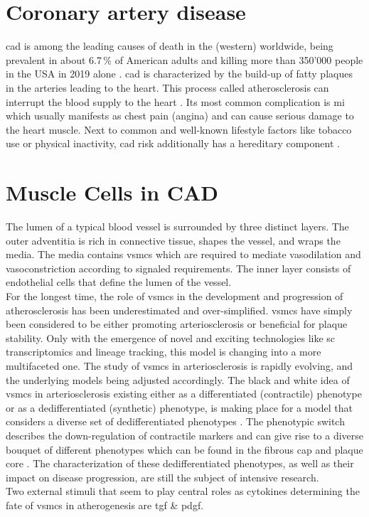 \section{Coronary artery disease}
\label{sec:cad}
\Ac{cad} is among the leading causes of death in the (western) worldwide, being prevalent in about 6.7\,\% of American adults and killing more than 350'000 people in the USA in 2019 alone \cite{centersfordiseasecontrolandpreventionHeartDiseaseFacts2022, fryarPrevalenceUncontrolledRisk2012}. \Ac{cad} is characterized by the build-up of fatty plaques in the arteries leading to the heart. This process called atherosclerosis can interrupt the blood supply to the heart \cite{nationalhealthserviceHeartAttack2017}. Its most common complication is \ac{mi} which usually manifests as chest pain (angina) and can cause serious damage to the heart muscle.  Next to common and well-known lifestyle factors like tobacco use or physical inactivity, \ac{cad} risk additionally has a hereditary component \cite{montalescot2013ESCGuidelines2013}.


\section{Muscle Cells in CAD}
\label{sec:haosms}
The lumen of a typical blood vessel is surrounded by three distinct layers. The outer adventitia is rich in connective tissue, shapes the vessel, and wraps the media. The media contains \acp{vsmc} which are required to mediate vasodilation and vasoconstriction according to signaled requirements. The inner layer consists of endothelial cells that define the lumen of the vessel. \cite{tuckerAnatomyBloodVessels2022a, yapSixShadesVascular2021}\\
For the longest time, the role of \acp{vsmc} in the development and progression of atherosclerosis has been underestimated and over-simplified. \acp{vsmc} have simply been considered to be either promoting arteriosclerosis or beneficial for plaque stability. Only with the emergence of novel and exciting technologies like \ac{sc} transcriptomics and lineage tracking, this model is changing into a more multifaceted one. \cite{grootaertVascularSmoothMuscle2021, yapSixShadesVascular2021} The study of \acp{vsmc} in arteriosclerosis is rapidly evolving, and the underlying models being adjusted accordingly. The black and white idea of \acp{vsmc} in arteriosclerosis existing either as a differentiated (contractile) phenotype or as a dedifferentiated (synthetic) phenotype, is making place for a model that considers a diverse set of dedifferentiated phenotypes \cite{grootaertVascularSmoothMuscle2021, yapSixShadesVascular2021}. The phenotypic switch describes the down-regulation of contractile markers and can give rise to a diverse bouquet of different phenotypes which can be found in the fibrous cap and plaque core \cite{grootaertVascularSmoothMuscle2021}. The characterization of these dedifferentiated phenotypes, as well as their impact on disease progression, are still the subject of intensive research.\\
Two external stimuli that seem to play central roles as cytokines determining the fate of \acp{vsmc} in atherogenesis are \ac{tgf} \& \ac{pdgf}.


